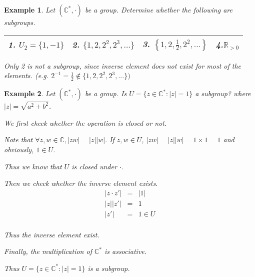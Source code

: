 \documentclass{article}
\theoremstyle{MyNonumberplain}
\theoremstyle{break}
\theoremstyle{break}
\newtheorem{example}{Example}[section]
\theoremstyle{break}
\theoremstyle{definition}
\theoremstyle{break}
\begin{document}
\begin{expbox}
    \begin{example}
        Let $(\mathbb{C}^{\ast}, \cdot)$ be a group. Determine whether the following are subgroups.

            {\noindent}\begin{tabularx}{1.0\textwidth}{|@{}X@{}|@{}X@{}|@{}X@{}|@{}X@{}|}
            \hline
            1. $U_2 = \{ 1, - 1 \}$ & 2. $\{ 1, 2, 2^2, 2^3, \ldots \}$ & 3. $\left\{ 1, 2,
            \frac{1}{2}, 2^2, \ldots \right\}$ & 4.$\mathbb{R}_{> 0}$\\
            
            \hline

            \end{tabularx}

            \begin{ansbox}
                Only 2 is not a subgroup, since inverse element does not exist for most of the elements.\bigskip
                (e.g. $2^{-1}=\frac{1}{2}\not\in \{1,2,2^2,2^3,...\})$
        
            \end{ansbox}
    \end{example}
\end{expbox}

\begin{expbox}
    \begin{example}
                Let $(\mathbb{C}^{\ast}, \cdot)$ be a group. Is $U = \{ z \in
        \mathbb{C}^{\ast} : | z | = 1 \}$ a subgroup? where $| z | = \sqrt{a^2 +
        b^2}$.
        \begin{ansbox}
            We first check whether the operation is closed or not.\bigskip

            Note that $\forall z, w \in \mathbb{C}, | z w | = | z | | w | .$ If $z, w \in
            U$, $| z w | = | z |  | w | = 1 \times 1 = 1$ and obviously, $1 \in U$.\bigskip
    
            Thus we know that $U$ is closed under $\cdot$.\bigskip
    
            Then we check whether the inverse element exists.\bigskip
            \begin{eqnarray*}
            | z \cdot z' | & = & | 1 |\\
            | z |  | z' | & = & 1\\
            | z' | & = & 1 \in U
            \end{eqnarray*}\\
            Thus the inverse element exist.\bigskip
    
            Finally, the multiplication of $\mathbb{C}^{\ast}$ is associative.\bigskip
    
            Thus $U = \{ z \in \mathbb{C}^{\ast} : | z | = 1 \}$ is a subgroup.
    
        \end{ansbox}

    \end{example}
\end{expbox}
\end{document}
